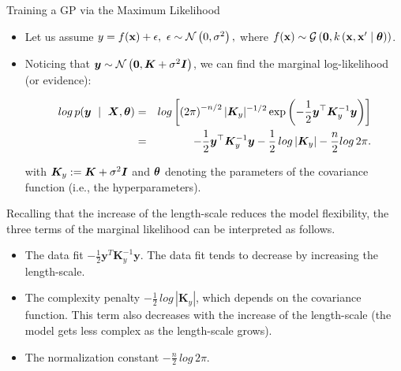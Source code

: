 \begin{frame}[c,allowframebreaks]{Training a GP via the Maximum Likelihood}

\begin{itemize}
\item Let us assume $y = f(\mathbf{x}) + \epsilon, ~ \epsilon \sim \mathcal{N}\left(0, \sigma^2\right),$ where $f(\mathbf{x}) \sim \mathcal{G}\left(\bm{0}, k\left(\mathbf{x}, \mathbf{x}^\prime \mid \bm{\theta} \right)\right)$.

\lz
\lz

\item Noticing that $\bm{y} \sim \mathcal{N}\left(\bm{0}, \bm{K} + \sigma^2 \boldsymbol{I}\right)$, we can find the marginal log-likelihood (or evidence):

\vspace{-5mm}

\begin{eqnarray*}
log\, p(\bm{y} ~\mid~ \bm{X}, \bm{\theta}) &=& log \left[\left(2 \pi\right)^{-n / 2} |\bm{K}_y|^{-1 / 2} \exp\left(- \frac{1}{2} \bm{y}^\top \bm{K}_y^{-1} \bm{y}\right) \right]\\
&=& -\frac{1}{2}\bm{y}^\top\bm{K}_y^{-1} \bm{y} - \frac{1}{2}\, log \left| \bm{K}_y \right| - \frac{n}{2} log\,2\pi.
\end{eqnarray*}

with $\bm{K}_y:=\bm{K} + \sigma^2 \boldsymbol{I}$ and $\bm{\theta}$ denoting the parameters of the covariance function (i.e., the hyperparameters).
\end{itemize}

\framebreak

Recalling that the increase of the length-scale reduces the model flexibility, the three terms of the marginal likelihood can be interpreted as follows.
\vspace{1cm}

\begin{itemize}
\item The data fit $-\frac{1}{2}\bm{y}^T\bm{K}_y^{-1} \bm{y}$. The data fit tends to decrease by increasing the length-scale.
\vspace{.5cm}

\item The complexity penalty $- \frac{1}{2}\,log\,\left| \bm{K}_y \right|$, which depends on the covariance function. This term also decreases with the increase of the length-scale (the model gets less complex as the length-scale grows).
\vspace{.5cm}

\item The normalization constant $- \frac{n}{2}\,log\,2\pi$.
\end{itemize}


\end{frame}

